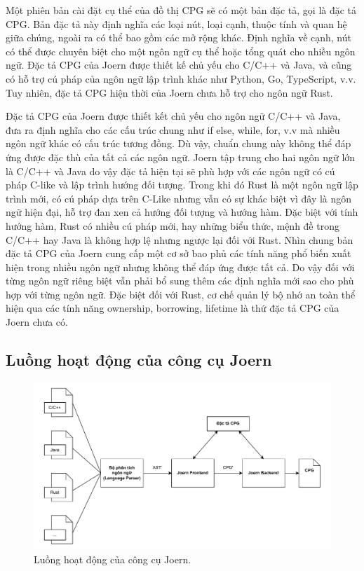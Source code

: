 Một phiên bản cài đặt cụ thể của đồ thị CPG sẽ có một bản đặc tả, gọi là đặc tả CPG.
Bản đặc tả này định nghĩa các loại nút, loại cạnh, thuộc tính và quan hệ giữa chúng, ngoài ra có thể bao gồm các mở rộng khác.
Định nghĩa về cạnh, nút có thể được chuyên biệt cho một ngôn ngữ cụ thể hoặc tổng quát cho nhiều ngôn ngữ.
Đặc tả CPG của Joern được thiết kế chủ yếu cho C/C++ và Java, và cũng có hỗ trợ cú pháp của ngôn ngữ lập trình khác như Python, Go, TypeScript, v.v.
Tuy nhiên, đặc tả CPG hiện thời của Joern chưa hỗ trợ cho ngôn ngữ Rust.

Đặc tả CPG của Joern được thiết kết chủ yếu cho ngôn ngữ C/C++ và Java, đưa ra định nghĩa cho các cấu trúc chung như if else, while, for, v.v mà nhiều ngôn ngữ khác có cấu trúc tương đồng.
Dù vậy, chuẩn chung này không thể đáp ứng được đặc thù của tất cả các ngôn ngữ.
Joern tập trung cho hai ngôn ngữ lớn là C/C++ và Java do vậy đặc tả hiện tại sẽ phù hợp với các ngôn ngữ có cú pháp C-like và lập trình hướng đối tượng.
Trong khi đó Rust là một ngôn ngữ lập trình mới, có cú pháp dựa trên C-Like nhưng vẫn có sự khác biệt vì đây là ngôn ngữ hiện đại, hỗ trợ đan xen cả hướng đối tượng và hướng hàm.
Đặc biệt với tính hướng hàm, Rust có nhiều cú pháp mới, hay những biểu thức, mệnh đề trong C/C++ hay Java là không hợp lệ nhưng ngược lại đối với Rust.
Nhìn chung bản đặc tả CPG của Joern cung cấp một cơ sở bao phủ các tính năng phổ biến xuất hiện trong nhiều ngôn ngữ nhưng không thể đáp ứng được tất cả.
Do vậy đối với từng ngôn ngữ riêng biệt vẫn phải bổ sung thêm các định nghĩa mới sao cho phù hợp với từng ngôn ngữ.
Đặc biệt đối với Rust, cơ chế quản lý bộ nhớ an toàn thể hiện qua các tính năng ownership, borrowing, lifetime là thứ đặc tả CPG của Joern chưa có.

\subsection{Luồng hoạt động của công cụ Joern}
\label{sec:joern_flow}

\begin{figure}[H]
  \includegraphics[width=1\columnwidth]{figures/c2/c2_frontend_backend.drawio.pdf}
  \centering
  \caption{Luồng hoạt động của công cụ Joern.}
  \label{img:c2_frontend_backend}
\end{figure}

